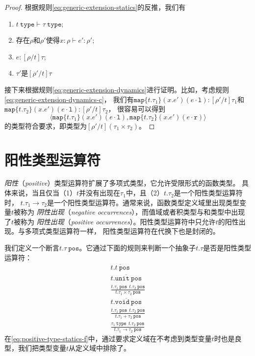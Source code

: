 \begin{proof}
	根据规则\ref{eq:generic-extension-statics}的反推，我们有
	\begin{enumerate}
		\item $t\ \texttt{type}\vdash\tau\ \texttt{type}$;
		\item 存在$\rho$和$\rho'$使得$x:\rho\vdash e':\rho'$;
		\item $e:[\rho/t]\tau$;
		\item $\tau'$是$[\rho'/t]\tau$
	\end{enumerate}
接下来根据规则\ref{eq:generic-extension-dynamics}进行证明。比如，考虑规则\ref{eq:generic-extension-dynamics-c}，
我们有$\texttt{map}\{t.\tau_1\}(x.e')(e\cdot\texttt{l}):[\rho'/t]\tau_1$和
$\texttt{map}\{t.\tau_2\}(x.e')(e\cdot\texttt{l}):[\rho'/t]\tau_2$，
很容易可以得到
$$\langle\texttt{map}\{t.\tau_1\}(x.e')(e\cdot \texttt{l}),\texttt{map}\{t.\tau_2\}(x.e')(e\cdot \texttt{r})\rangle$$
的类型符合要求，即类型为$[\rho'/t](\tau_1\times\tau_2)$。
\end{proof}

\section{阳性类型运算符}

\textit{阳性}（\textit{positive}）类型运算符扩展了多项式类型，它允许受限形式的函数类型。
具体来说，当且仅当（1）$t$并没有出现在$\tau_1$中，且（2）$t.\tau_2$是一个阳性类型运算符时，
$t.\tau_1\rightarrow\tau_2$是一个阳性类型运算符。通常来说，函数类型定义域里出现类型变量$t$被称为
\textit{阴性出现}（\textit{negative occurrences}），而值域或者积类型与和类型中出现了$t$被称为
\textit{阳性出现}（\textit{positive occurrences}）。阳性类型运算符中只允许$t$的阳性出现。与多项式类型运算符一样，
阳性类型运算符在代换下也是封闭的。

我们定义一个断言$t.\tau\ \texttt{pos}$。它通过下面的规则来判断一个抽象子$t.\tau$是否是阳性类型运算符：
\begin{subequations}\label{eq:positive-type-statics}
	\begin{gather}
	\overline{t.t\ \texttt{pos}} \label{eq:positive-type-statics-a} \\
	\overline{t.\texttt{unit}\ \texttt{pos}} \label{eq:positive-type-statics-b}\\
	\frac{t.\tau_1\ \texttt{pos}\ \ t.\tau_2\ \texttt{pos}}{t.\tau_1\times\tau_2\ \texttt{pos}} \label{eq:positive-type-statics-c}\\
	\overline{t.\texttt{void}\ \texttt{pos}} \label{eq:positive-type-statics-d}\\
	\frac{t.\tau_1\ \texttt{pos}\ \ t.\tau_2\ \texttt{pos}}{t.\tau_1+\tau_2\ \texttt{pos}} \label{eq:positive-type-statics-e}\\
	\frac{\tau_1\ \texttt{type}\ \ t.\tau_2\ \texttt{pos}}{t.\tau_1\rightarrow\tau_2\ \texttt{pos}}\label{eq:positive-type-statics-f}
	\end{gather}
\end{subequations}
在\ref{eq:positive-type-statics-f}中，通过要求定义域在不考虑到类型变量$t$时也是良型，我们把类型变量$t$从定义域中排除了。

